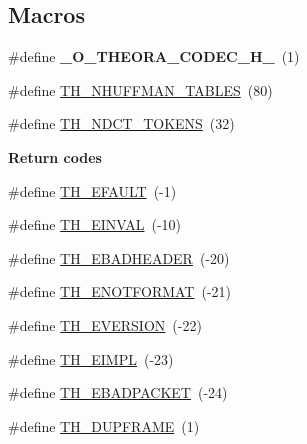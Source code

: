 \subsection*{Macros}
\begin{DoxyCompactItemize}
\item 
\hypertarget{theora_2libtheora-1_81_81_2include_2theora_2codec_8h_a15352a6a862d25ab00a8f06ea65ee75b}{\#define {\bfseries \+\_\+\+O\+\_\+\+T\+H\+E\+O\+R\+A\+\_\+\+C\+O\+D\+E\+C\+\_\+\+H\+\_\+}~(1)}\label{theora_2libtheora-1_81_81_2include_2theora_2codec_8h_a15352a6a862d25ab00a8f06ea65ee75b}

\item 
\#define \hyperlink{theora_2libtheora-1_81_81_2include_2theora_2codec_8h_a49bf449eae33c5320f0c308f32c6ae42}{T\+H\+\_\+\+N\+H\+U\+F\+F\+M\+A\+N\+\_\+\+T\+A\+B\+L\+E\+S}~(80)
\item 
\#define \hyperlink{theora_2libtheora-1_81_81_2include_2theora_2codec_8h_a2a44f48084e76a58cae48fb5d47cd422}{T\+H\+\_\+\+N\+D\+C\+T\+\_\+\+T\+O\+K\+E\+N\+S}~(32)
\end{DoxyCompactItemize}
\begin{Indent}{\bf Return codes}\par
\begin{DoxyCompactItemize}
\item 
\#define \hyperlink{theora_2libtheora-1_81_81_2include_2theora_2codec_8h_a4d8d8e34fc5ec39ffa05d61a310a0407}{T\+H\+\_\+\+E\+F\+A\+U\+L\+T}~(-\/1)
\item 
\#define \hyperlink{theora_2libtheora-1_81_81_2include_2theora_2codec_8h_afbbd9f19fbf292aeb62a37792cecb870}{T\+H\+\_\+\+E\+I\+N\+V\+A\+L}~(-\/10)
\item 
\#define \hyperlink{theora_2libtheora-1_81_81_2include_2theora_2codec_8h_af00f7ecc5242d12a717202537324a510}{T\+H\+\_\+\+E\+B\+A\+D\+H\+E\+A\+D\+E\+R}~(-\/20)
\item 
\#define \hyperlink{theora_2libtheora-1_81_81_2include_2theora_2codec_8h_a3dc08a00a9aba231be398f3e31726d9c}{T\+H\+\_\+\+E\+N\+O\+T\+F\+O\+R\+M\+A\+T}~(-\/21)
\item 
\#define \hyperlink{theora_2libtheora-1_81_81_2include_2theora_2codec_8h_ac3a45ef2b24f75259258edc481e3a122}{T\+H\+\_\+\+E\+V\+E\+R\+S\+I\+O\+N}~(-\/22)
\item 
\#define \hyperlink{theora_2libtheora-1_81_81_2include_2theora_2codec_8h_a921c47accc17841f220af5a6afb79efe}{T\+H\+\_\+\+E\+I\+M\+P\+L}~(-\/23)
\item 
\#define \hyperlink{theora_2libtheora-1_81_81_2include_2theora_2codec_8h_a6efb84e9c2213a8840003eee2847b27f}{T\+H\+\_\+\+E\+B\+A\+D\+P\+A\+C\+K\+E\+T}~(-\/24)
\item 
\#define \hyperlink{theora_2libtheora-1_81_81_2include_2theora_2codec_8h_ab10e7b64f17a02707fc9348ea9832d09}{T\+H\+\_\+\+D\+U\+P\+F\+R\+A\+M\+E}~(1)
\end{DoxyCompactItemize}
\end{Indent}
